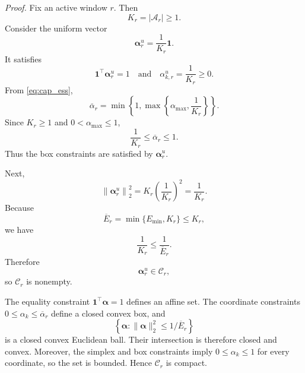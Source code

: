 \noindent\emph{Proof.}
Fix an active window $r$.  Then
\begin{equation}
    K_r=|\mathcal{A}_r|\ge1.
    \label{eq:app_K_positive}
\end{equation}
Consider the uniform vector
\begin{equation}
    \boldsymbol\alpha_r^{u}
    =
    \frac{1}{K_r}\mathbf{1}.
    \label{eq:app_uniform_alpha}
\end{equation}
It satisfies
\begin{equation}
    \mathbf{1}^{\top}\boldsymbol\alpha_r^{u}=1
    \quad\text{and}\quad
    \alpha_{k,r}^{u}=\frac{1}{K_r}\ge0.
    \label{eq:app_uniform_simplex}
\end{equation}
From \eqref{eq:cap_ess},
\begin{equation}
    \overline\alpha_r
    =
    \min\left\{
    1,
    \max\left\{
    \alpha_{\max},
    \frac{1}{K_r}
    \right\}
    \right\}.
    \label{eq:app_alpha_bar}
\end{equation}
Since $K_r\ge1$ and $0<\alpha_{\max}\le1$,
\begin{equation}
    \frac{1}{K_r}\le\overline\alpha_r\le1.
    \label{eq:app_uniform_box}
\end{equation}
Thus the box constraints are satisfied by
$\boldsymbol\alpha_r^{u}$.

Next,
\begin{equation}
    \left\|
    \boldsymbol\alpha_r^{u}
    \right\|_2^2
    =
    K_r\left(\frac{1}{K_r}\right)^2
    =
    \frac{1}{K_r}.
    \label{eq:app_uniform_l2}
\end{equation}
Because
\begin{equation}
    \overline E_r
    =
    \min\{E_{\min},K_r\}
    \le K_r,
    \label{eq:app_Ebar_leq_K}
\end{equation}
we have
\begin{equation}
    \frac{1}{K_r}
    \le
    \frac{1}{\overline E_r}.
    \label{eq:app_uniform_ess}
\end{equation}
Therefore
\begin{equation}
    \boldsymbol\alpha_r^{u}
    \in
    \mathcal{C}_r,
    \label{eq:app_C_nonempty}
\end{equation}
so $\mathcal{C}_r$ is nonempty.

The equality constraint
$\mathbf{1}^{\top}\boldsymbol\alpha=1$ defines an affine set.  The coordinate
constraints
$0\le\alpha_k\le\overline\alpha_r$ define a closed convex box, and
\begin{equation}
    \left\{
    \boldsymbol\alpha:
    \|\boldsymbol\alpha\|_2^2
    \le
    1/\overline E_r
    \right\}
    \label{eq:app_l2_ball}
\end{equation}
is a closed convex Euclidean ball.  Their intersection is therefore closed and
convex.  Moreover, the simplex and box constraints imply
$0\le\alpha_k\le1$ for every coordinate, so the set is bounded.  Hence
$\mathcal{C}_r$ is compact.

